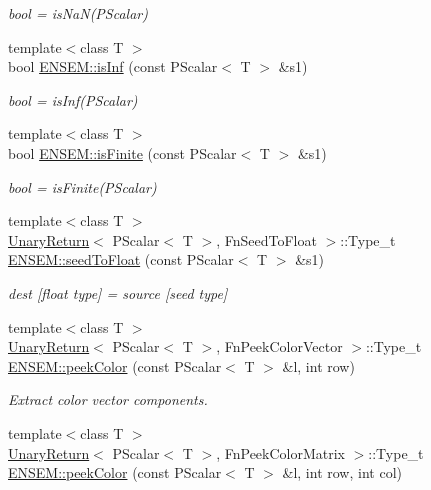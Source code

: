 \begin{DoxyCompactItemize}
\begin{DoxyCompactList}\small\item\em bool = is\+Na\+N(\+P\+Scalar) \end{DoxyCompactList}\item 
{\footnotesize template$<$class T $>$ }\\bool \mbox{\hyperlink{group__primscalar_gadaa3bcd952c27bc79132fc1037584dcc}{E\+N\+S\+E\+M\+::is\+Inf}} (const P\+Scalar$<$ T $>$ \&s1)
\begin{DoxyCompactList}\small\item\em bool = is\+Inf(\+P\+Scalar) \end{DoxyCompactList}\item 
{\footnotesize template$<$class T $>$ }\\bool \mbox{\hyperlink{group__primscalar_ga3dab2cae6c55a7a86676323b203a758d}{E\+N\+S\+E\+M\+::is\+Finite}} (const P\+Scalar$<$ T $>$ \&s1)
\begin{DoxyCompactList}\small\item\em bool = is\+Finite(\+P\+Scalar) \end{DoxyCompactList}\item 
{\footnotesize template$<$class T $>$ }\\\mbox{\hyperlink{structUnaryReturn}{Unary\+Return}}$<$ P\+Scalar$<$ T $>$, Fn\+Seed\+To\+Float $>$\+::Type\+\_\+t \mbox{\hyperlink{group__primscalar_ga5a261606d393edcbce00c050e5a5cbd5}{E\+N\+S\+E\+M\+::seed\+To\+Float}} (const P\+Scalar$<$ T $>$ \&s1)
\begin{DoxyCompactList}\small\item\em dest \mbox{[}float type\mbox{]} = source \mbox{[}seed type\mbox{]} \end{DoxyCompactList}\item 
{\footnotesize template$<$class T $>$ }\\\mbox{\hyperlink{structUnaryReturn}{Unary\+Return}}$<$ P\+Scalar$<$ T $>$, Fn\+Peek\+Color\+Vector $>$\+::Type\+\_\+t \mbox{\hyperlink{group__primscalar_ga99ea9420e1cb79a4dbc92fd7aab84f80}{E\+N\+S\+E\+M\+::peek\+Color}} (const P\+Scalar$<$ T $>$ \&l, int row)
\begin{DoxyCompactList}\small\item\em Extract color vector components. \end{DoxyCompactList}\item 
{\footnotesize template$<$class T $>$ }\\\mbox{\hyperlink{structUnaryReturn}{Unary\+Return}}$<$ P\+Scalar$<$ T $>$, Fn\+Peek\+Color\+Matrix $>$\+::Type\+\_\+t \mbox{\hyperlink{group__primscalar_ga5e0077638719795b3ad6bba20ddb9d4d}{E\+N\+S\+E\+M\+::peek\+Color}} (const P\+Scalar$<$ T $>$ \&l, int row, int col)

\end{DoxyCompactItemize}
